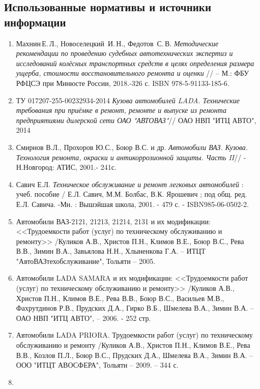 
\subsection{Использованные нормативы и источники информации}
%
\begin{enumerate}
\item 
Махнин\,Е.\,Л., Новоселецкий\, И.\,Н., Федотов\, С.\,В. \emph{Методические рекомендации по проведению судебных автотехнических экспертиз и исследований колёсных транспортных средств в целях определения размера ущерба, стоимости восстановительного ремонта и оценки} // -- М.: ФБУ РФЦСЭ при Минюсте России, 2018.-326 с.  ISBN 978-5-91133-185-6.
%
%
%
%
\item ТУ 017207-255-00232934-2014 \emph{Кузова автомобилей LADA. Технические требования при приёмке в ремонт, ремонте и выпуске из ремонта предприятиями дилерской сети ОАО "АВТОВАЗ"}//  ОАО НВП "ИТЦ АВТО", 2014
%
\item Смирнов  В.Л., Прохоров  Ю.С., Боюр В.С.  и др. \emph{Автомобили ВАЗ. Кузова. Технология ремонта, окраски и  антикоррозионной защиты. Часть II}// - Н.Новгород: АТИС, 2001.- 241с.
%
\item 
Савич Е.Л. \emph{Техническое  обслуживание  и  ремонт  легковых  автомобилей} : учеб. пособие / Е.Л. Савич, М.М. Болбас, В.К. Ярошевич ; под общ. ред. Е.Л. Савича. -Мн. : Вышэйшая школа,  2001. - 479 с. - ISBN985-06-0502-2.
%
\item 
Автомобили ВАЗ-2121, 21213, 21214, 2131 и их модификации: <<Трудоемкости работ (услуг) по техническому обслуживанию и ремонту>> /Куликов А.В., Христов П.Н., Климов В.Е.,  Боюр В.С., Рева В.В., Зимин В.А., Завьялова Н.Н., Хлыненкова Г.А. -- ИТЦТ "АвтоВАЗтехобслуживание", Тольяти -- 2005. 
%
\item
Автомобили LADA SAMARA и их модификации: <<Трудоемкости работ (услуг) по техническому обслуживанию и ремонту>> /Куликов А.В., Христов П.Н., Климов В.Е., Рева В.В., Боюр В.С., Васильев М.В., Фахрутдинов Р.В.,  Прудских Д.А., Гирко В.Б., Шмелева В.А., Зимин В.А. --  ОАО НВП "ИТЦ АВТО",  -- 2006. - 252 стр.
%
\item 
Автомобили LADA PRIORA. Трудоемкости работ (услуг) по техническому обслуживанию и ремонту /Куликов А.В., Христов П.Н., Климов В.Е., Рева В.В., Козлов П.Л., Боюр В.С., Прудских Д.А., Шмелева В.А., Зимин В.А. -- ООО "ИТЦТ АВОСФЕРА", Тольяти -- 2009. -- 344 с.
%
\item 

\end{enumerate}
